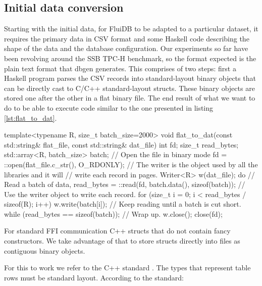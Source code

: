 \subsection{Initial data conversion}

Starting with the initial data, for FluiDB to be adapted
to a particular dataset, it requires the primary data in CSV format and
some Haskell code describing the shape of the data and the database
configuration. Our experiments so far have been revolving around the
SSB TPC-H benchmark, so the format expected is the plain text format
that dbgen \cite{perivolaropoulosFakedrakeSsbdbgen2021}
generates. This  comprises of two steps: first a Haskell program
parses the CSV records into standard-layout binary objects that can be
directly cast to C/C++ standard-layout structs. These binary objects
are stored one after the other in a flat binary file. The end result
of what we want to do to be able to execute code similar to the one
presented in listing \ref{lst:flat_to_dat}.

\begin{code}
\begin{cppcode}
template<typename R, size_t batch_size=2000>
void flat_to_dat(const std::string& flat_file, const std::string& dat_file) {
  int fd;
  size_t read_bytes;
  std::array<R, batch_size> batch;
  // Open the file in binary mode
  fd = ::open(flat_file.c_str(), O_RDONLY);
  // The writer is the object used by all the libraries and it will
  // write each record in pages.
  Writer<R> w(dat_file);
  do {
    // Read a batch of data,
    read_bytes = ::read(fd, batch.data(), sizeof(batch));
    // Use the writer object to write each record.
    for (size_t i = 0; i < read_bytes / sizeof(R); i++) {
      w.write(batch[i]);
    }
    // Keep reading until a batch is cut short.
  } while (read_bytes == sizeof(batch));
  // Wrap up.
  w.close();
  close(fd);
}
\end{cppcode}
  \caption{\label{lst:flat_to_dat}For standard FFI communication C++
    structs that do not contain fancy constructors. We take advantage of that
    to store structs directly into files as contiguous binary objects.}
\end{code}

For this to work we refer to the C++ standard
\cite{14:00-17:00ISOIEC14882}. The types that represent table rows must
be standard layout. According to the standard:

